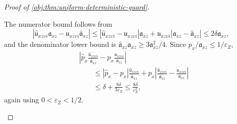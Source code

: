 \documentclass[11pt]{article}
\begin{document}
\begin{proof}[Proof of \cref{obj:thm:uniform-deterministic-guard}]
\begin{enumerate}
\[\]
The numerator bound follows from
\[
|\widehat{\mathfrak u}_{xz\upsilon i}\mathfrak a_{xz}-\mathfrak u_{xz\upsilon i}\widehat{\mathfrak a}_{xz}|
\le
|\widehat{\mathfrak u}_{xz\upsilon i}-\mathfrak u_{xz\upsilon i}|\mathfrak a_{xz}
+
\mathfrak u_{xz\upsilon i}|\mathfrak a_{xz}-\widehat{\mathfrak a}_{xz}|
\le
2\delta\mathfrak a_{xz},
\]
and the denominator lower bound is
\(\widehat{\mathfrak a}_{xz}\mathfrak a_{xz}\ge3\mathfrak a_{xz}^2/4\).  Since
\(p_x/\mathfrak a_{xz}\le1/\varepsilon_Z\),
\[
\begin{aligned}
&\left|
\widehat p_x\frac{\widehat{\mathfrak u}_{xz\upsilon i}}{\widehat{\mathfrak a}_{xz}}
-
p_x\frac{\mathfrak u_{xz\upsilon i}}{\mathfrak a_{xz}}
\right| \\
&\qquad\le
|\widehat p_x-p_x|\frac{\widehat{\mathfrak u}_{xz\upsilon i}}{\widehat{\mathfrak a}_{xz}}
+
p_x\left|
\frac{\widehat{\mathfrak u}_{xz\upsilon i}}{\widehat{\mathfrak a}_{xz}}
-
\frac{\mathfrak u_{xz\upsilon i}}{\mathfrak a_{xz}}
\right| \\
&\qquad\le
\delta+\frac{8\delta}{3\varepsilon_Z}
\le
\frac{8\delta}{\varepsilon_Z^2},
\end{aligned}
\]
again using \(0<\varepsilon_Z<1/2\).


\end{enumerate}
\end{proof}
\end{document}

